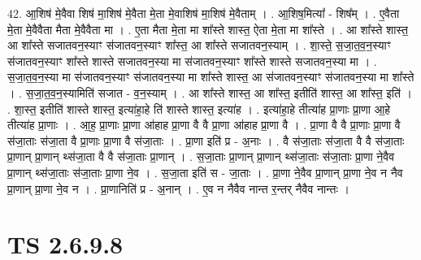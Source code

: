 \documentclass[17pt]{extarticle}
\begin{document}
42. आ॒शिष॑ मे॒वैवा शिष॑ मा॒शिष॑ मे॒वैता मे॒ता मे॒वाशिष॑ मा॒शिष॑ मे॒वैताम् । . आ॒शिष॒मित्या᳚ - शिष᳚म् । . ए॒वैता मे॒ता मे॒वैवैता मैता मे॒वैवैता मा । . ए॒ता मैता मे॒ता मा शा᳚स्ते शास्त॒ ऐता मे॒ता मा शा᳚स्ते । . आ शा᳚स्ते शास्त॒ आ शा᳚स्ते सजातवन॒स्याꣳ स॑जातवन॒स्याꣳ शा᳚स्त॒ आ शा᳚स्ते सजातवन॒स्याम् । . शा॒स्ते॒ स॒जा॒त॒व॒न॒स्याꣳ स॑जातवन॒स्याꣳ शा᳚स्ते शास्ते सजातवन॒स्या मा स॑जातवन॒स्याꣳ शा᳚स्ते शास्ते सजातवन॒स्या मा । . स॒जा॒त॒व॒न॒स्या मा स॑जातवन॒स्याꣳ स॑जातवन॒स्या मा शा᳚स्ते शास्त॒ आ स॑जातवन॒स्याꣳ स॑जातवन॒स्या मा शा᳚स्ते । . स॒जा॒त॒व॒न॒स्यामिति॑ सजात - व॒न॒स्याम् । . आ शा᳚स्ते शास्त॒ आ शा᳚स्त॒ इतीति॑ शास्त॒ आ शा᳚स्त॒ इति॑ । . शा॒स्त॒ इतीति॑ शास्ते शास्त॒ इत्या॑हा॒हे ति॑ शास्ते शास्त॒ इत्या॑ह । . इत्या॑हा॒हे तीत्या॑ह प्रा॒णाः प्रा॒णा आ॒हे तीत्या॑ह प्रा॒णाः । . आ॒ह॒ प्रा॒णाः प्रा॒णा आ॑हाह प्रा॒णा वै वै प्रा॒णा आ॑हाह प्रा॒णा वै । . प्रा॒णा वै वै प्रा॒णाः प्रा॒णा वै स॑जा॒ताः स॑जा॒ता वै प्रा॒णाः प्रा॒णा वै स॑जा॒ताः । . प्रा॒णा इति॑ प्र - अ॒नाः । . वै स॑जा॒ताः स॑जा॒ता वै वै स॑जा॒ताः प्रा॒णान् प्रा॒णान् थ्स॑जा॒ता वै वै स॑जा॒ताः प्रा॒णान् । . स॒जा॒ताः प्रा॒णान् प्रा॒णान् थ्स॑जा॒ताः स॑जा॒ताः प्रा॒णा ने॒वैव प्रा॒णान् थ्स॑जा॒ताः स॑जा॒ताः प्रा॒णा ने॒व । . स॒जा॒ता इति॑ स - जा॒ताः । . प्रा॒णा ने॒वैव प्रा॒णान् प्रा॒णा ने॒व न नैव प्रा॒णान् प्रा॒णा ने॒व न । . प्रा॒णानिति॑ प्र - अ॒नान् । . ए॒व न नैवैव नान्त र॒न्तर् नैवैव नान्तः । \newline
\pagebreak
{}

\section{ TS 2.6.9.8 }
\end{document}
